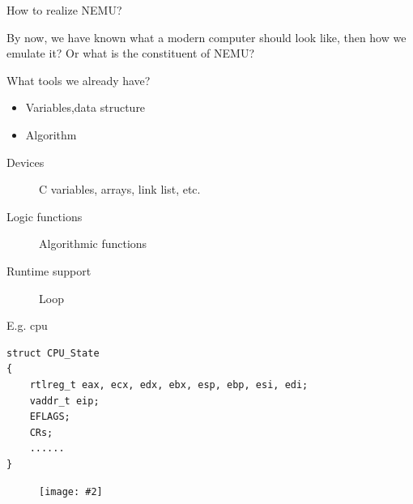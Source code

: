 \documentclass{beamer}
\newcommand{\fignocaption}[2]{
	\begin{figure}[htp]
		\centering
		\texttt{[image: \#2]}
	\end{figure}
}
\begin{document}
%		
%	
%	

\begin{frame}{How to realize NEMU?}
	\begin{block}{}
		By now, we have known what a modern computer should look like, then how we emulate it? Or what is the constituent of NEMU?
	\end{block}
\pause
	\begin{block}{What tools we already have?}
		\pause
		\begin{itemize}
			\item Variables,data structure
			\item Algorithm
		\end{itemize}
	
		
	\end{block}
	\begin{description}
		\item[Devices] C variables, arrays, link list, etc.
		\item[Logic functions] Algorithmic functions
		\item[Runtime support] Loop
	\end{description}
\end{frame}

\begin{frame}[fragile]{E.g. cpu}
\begin{verbatim}
struct CPU_State
{
    rtlreg_t eax, ecx, edx, ebx, esp, ebp, esi, edi;
    vaddr_t eip;
    EFLAGS;
    CRs;
    ......
}
\end{verbatim}
\fignocaption{scale=0.2}{cpu.jpg}
\end{frame}
\end{document}
